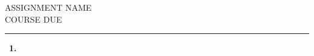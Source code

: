 \documentclass[11pt]{article}
\newcommand{\name}{NAME}
\newcommand{\course}{COURSE}
\newcommand{\assignment}{ASSIGNMENT}
\newcommand{\duedate}{DUE}
\newcommand{\hwtitle}{
    \begin{flushleft}
        \assignment     \hspace*{\fill}         \name       \\
        \course         \hspace*{\fill}         \duedate    \\
        \rule[10pt]{\linewidth}{0.5pt}
    \end{flushleft}
}
\newenvironment{exercise}[2][]
{\begin{trivlist}
    \item[\hspace{0pt} \textbf{#1}~\textbf{#2.}]}
{\end{trivlist}}
\begin{document}
\thispagestyle{empty}
\hwtitle

\begin{exercise}{1}
\end{exercise}
\end{document}

